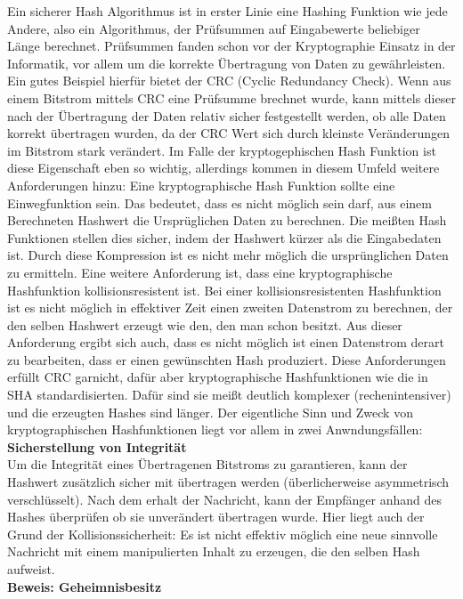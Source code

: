 \documentclass[12pt,a4paper,bibliography=totocnumbered,listof=totocnumbered]{scrartcl}
\begin{document}
Ein sicherer Hash Algorithmus ist in erster Linie eine Hashing Funktion wie jede Andere, also ein Algorithmus, der Prüfsummen auf Eingabewerte beliebiger Länge berechnet. Prüfsummen fanden schon vor der Kryptographie Einsatz in der Informatik, vor allem um die korrekte Übertragung von Daten zu gewährleisten. Ein gutes Beispiel hierfür bietet der CRC (Cyclic Redundancy Check). Wenn aus einem Bitstrom mittels CRC eine Prüfsumme brechnet wurde, kann mittels dieser nach der Übertragung der Daten relativ sicher festgestellt werden, ob alle Daten korrekt übertragen wurden, da der CRC Wert sich durch kleinste Veränderungen im Bitstrom stark verändert. Im Falle der kryptogephischen Hash Funktion ist diese Eigenschaft eben so wichtig, allerdings kommen  in diesem Umfeld weitere Anforderungen hinzu: Eine kryptographische Hash Funktion sollte eine Einwegfunktion sein. Das bedeutet, dass es nicht möglich sein darf, aus einem Berechneten Hashwert die Ursprüglichen Daten zu berechnen. Die meißten Hash Funktionen stellen dies sicher, indem der Hashwert kürzer als die Eingabedaten ist. Durch diese Kompression ist es nicht mehr möglich die ursprünglichen Daten zu ermitteln. Eine weitere Anforderung ist, dass eine kryptographische Hashfunktion kollisionsresistent ist. Bei einer kollisionsresistenten Hashfunktion ist es nicht möglich in effektiver Zeit einen zweiten Datenstrom zu berechnen, der den selben Hashwert erzeugt wie den, den man schon besitzt. Aus dieser Anforderung ergibt sich auch, dass es nicht möglich ist einen Datenstrom derart zu bearbeiten, dass er einen gewünschten Hash produziert. Diese Anforderungen erfüllt CRC garnicht, dafür aber kryptographische Hashfunktionen wie die in SHA standardisierten. Dafür sind sie meißt deutlich komplexer (rechenintensiver) und die erzeugten Hashes sind länger. Der eigentliche Sinn und Zweck von kryptographischen Hashfunktionen liegt vor allem in zwei Anwndungsfällen:
\\\textbf{Sicherstellung von Integrität}\\
Um die Integrität eines Übertragenen Bitstroms zu garantieren, kann der Hashwert zusätzlich sicher mit übertragen werden (überlicherweise asymmetrisch verschlüsselt). Nach dem erhalt der Nachricht, kann der Empfänger anhand des Hashes überprüfen ob sie unverändert übertragen wurde. Hier liegt auch der Grund der Kollisionssicherheit: Es ist nicht effektiv möglich eine neue sinnvolle Nachricht mit einem manipulierten Inhalt zu erzeugen, die den selben Hash aufweist.
\\\textbf{Beweis: Geheimnisbesitz}\\
\end{document}
